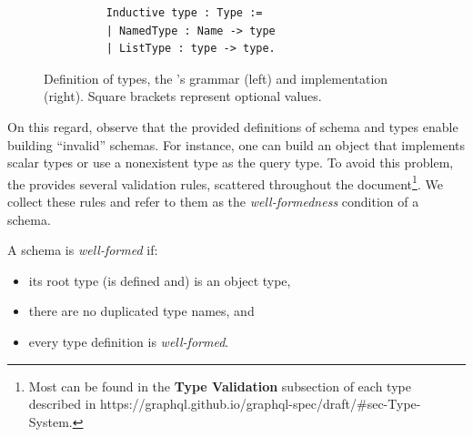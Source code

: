 \begin{figure}[h]
\begin{subfigure}{.5\textwidth}
\begin{verbatim}
    Inductive type : Type :=
    | NamedType : Name -> type
    | ListType : type -> type.
    \end{verbatim}

    \end{subfigure}
    \caption{Definition of \gql types, the \spec's grammar (left) and \coq implementation (right). Square brackets represent optional values. }
    \label{fig:types_def}
\end{figure}




On this regard, observe that the provided definitions of schema and types enable building ``invalid'' schemas. For instance, one can build an object that implements scalar types or use a nonexistent type as the query type. To avoid this problem, the \spec provides several validation rules, scattered throughout the document\footnote{Most can be found in the \textbf{Type Validation} subsection of each type described in https://graphql.github.io/graphql-spec/draft/\#sec-Type-System.}.  We collect these rules and refer to them as the \textit{well-formedness} condition of a \gql schema.


\begin{definition}
A \gql schema is \textit{well-formed} if: 
\begin{itemize}
    \item its root type (is defined and) is an object type, 
    \item there are no duplicated type names, and
    \item every type definition is \textit{well-formed}.
\end{itemize}
\end{definition}

